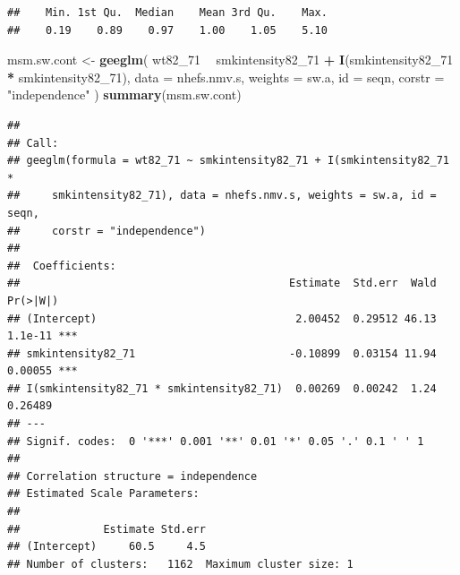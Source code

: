 \documentclass[
  10pt,
]{book}
\newenvironment{Shaded}{\begin{snugshade}}{\end{snugshade}}
\newcommand{\CommentTok}[1]{\textcolor[rgb]{0.56,0.35,0.01}{\textit{#1}}}
\newcommand{\DataTypeTok}[1]{\textcolor[rgb]{0.13,0.29,0.53}{#1}}
\newcommand{\DecValTok}[1]{\textcolor[rgb]{0.00,0.00,0.81}{#1}}
\newcommand{\KeywordTok}[1]{\textcolor[rgb]{0.13,0.29,0.53}{\textbf{#1}}}
\newcommand{\NormalTok}[1]{#1}
\newcommand{\OperatorTok}[1]{\textcolor[rgb]{0.81,0.36,0.00}{\textbf{#1}}}
\newcommand{\StringTok}[1]{\textcolor[rgb]{0.31,0.60,0.02}{#1}}
\begin{document}
\begin{Shaded}
\end{Shaded}

\begin{verbatim}
##    Min. 1st Qu.  Median    Mean 3rd Qu.    Max. 
##    0.19    0.89    0.97    1.00    1.05    5.10
\end{verbatim}

\begin{Shaded}
\begin{Highlighting}[]
\NormalTok{msm.sw.cont <-}
\StringTok{  }\KeywordTok{geeglm}\NormalTok{(}
\NormalTok{    wt82_}\DecValTok{71} \OperatorTok{~}\StringTok{ }\NormalTok{smkintensity82_}\DecValTok{71} \OperatorTok{+}\StringTok{ }\KeywordTok{I}\NormalTok{(smkintensity82_}\DecValTok{71} \OperatorTok{*}\StringTok{ }\NormalTok{smkintensity82_}\DecValTok{71}\NormalTok{),}
    \DataTypeTok{data =}\NormalTok{ nhefs.nmv.s,}
    \DataTypeTok{weights =}\NormalTok{ sw.a,}
    \DataTypeTok{id =}\NormalTok{ seqn,}
    \DataTypeTok{corstr =} \StringTok{"independence"}
\NormalTok{  )}
\KeywordTok{summary}\NormalTok{(msm.sw.cont)}
\end{Highlighting}
\end{Shaded}

\begin{verbatim}
## 
## Call:
## geeglm(formula = wt82_71 ~ smkintensity82_71 + I(smkintensity82_71 * 
##     smkintensity82_71), data = nhefs.nmv.s, weights = sw.a, id = seqn, 
##     corstr = "independence")
## 
##  Coefficients:
##                                          Estimate  Std.err  Wald Pr(>|W|)    
## (Intercept)                               2.00452  0.29512 46.13  1.1e-11 ***
## smkintensity82_71                        -0.10899  0.03154 11.94  0.00055 ***
## I(smkintensity82_71 * smkintensity82_71)  0.00269  0.00242  1.24  0.26489    
## ---
## Signif. codes:  0 '***' 0.001 '**' 0.01 '*' 0.05 '.' 0.1 ' ' 1
## 
## Correlation structure = independence 
## Estimated Scale Parameters:
## 
##             Estimate Std.err
## (Intercept)     60.5     4.5
## Number of clusters:   1162  Maximum cluster size: 1
\end{verbatim}
\end{document}
